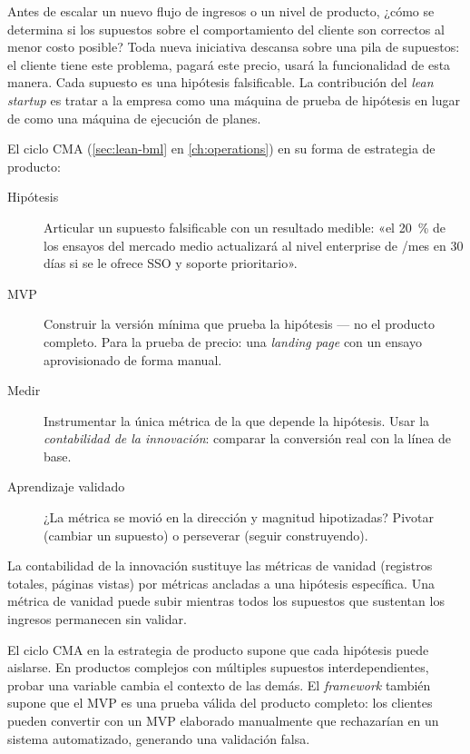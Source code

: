 Antes de escalar un nuevo flujo de ingresos o un nivel de producto, ¿cómo se determina si los supuestos sobre el comportamiento del cliente son correctos al menor costo posible? Toda nueva iniciativa descansa sobre una pila de supuestos: el cliente tiene este problema, pagará este precio, usará la funcionalidad de esta manera. Cada supuesto es una hipótesis falsificable. La contribución del \emph{lean startup} es tratar a la empresa como una máquina de prueba de hipótesis en lugar de como una máquina de ejecución de planes.

El ciclo CMA (\cref{sec:lean-bml} en \cref{ch:operations}) en su forma de estrategia de producto:
\begin{description}
  \item[Hipótesis] Articular un supuesto falsificable con un resultado medible: «el \qty{20}{\percent} de los ensayos del mercado medio actualizará al nivel enterprise de /mes en 30 días si se le ofrece SSO y soporte prioritario».
  \item[MVP] Construir la versión mínima que prueba la hipótesis --- no el producto completo. Para la prueba de precio: una \emph{landing page} con un ensayo aprovisionado de forma manual.
  \item[Medir] Instrumentar la única métrica de la que depende la hipótesis. Usar la \emph{contabilidad de la innovación}: comparar la conversión real con la línea de base.
  \item[Aprendizaje validado] ¿La métrica se movió en la dirección y magnitud hipotizadas? Pivotar (cambiar un supuesto) o perseverar (seguir construyendo).
\end{description}
La contabilidad de la innovación sustituye las métricas de vanidad (registros totales, páginas vistas) por métricas ancladas a una hipótesis específica. Una métrica de vanidad puede subir mientras todos los supuestos que sustentan los ingresos permanecen sin validar.

El ciclo CMA en la estrategia de producto supone que cada hipótesis puede aislarse. En productos complejos con múltiples supuestos interdependientes, probar una variable cambia el contexto de las demás. El \emph{framework} también supone que el MVP es una prueba válida del producto completo: los clientes pueden convertir con un MVP elaborado manualmente que rechazarían en un sistema automatizado, generando una validación falsa.

